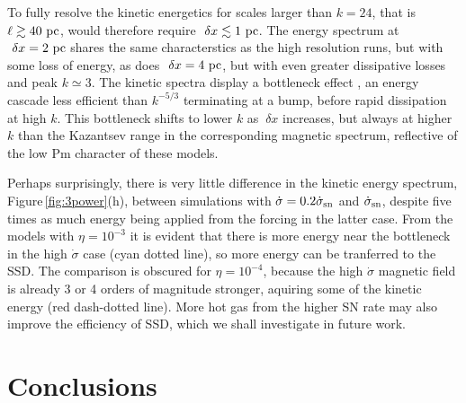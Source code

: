 \documentclass[preprint2]{aastex63}
\newcommand\SNr{\dot\sigma_{\rm sn}}
\newcommand\pc{~ {\rm pc}}
\newcommand\dx{~ {\delta x}}
\begin{document}
To fully resolve the kinetic energetics for scales larger than $k=24$, that is
$\ell\gtrsim40\pc$, would therefore require $\dx\lesssim1\pc$.
The energy spectrum at $\dx=2\pc$ shares the same characterstics as the high
resolution runs, but with some loss of energy, as does $\dx=4\pc$, but with 
even greater dissipative losses and peak $k\simeq3$.
The kinetic spectra display a bottleneck effect \citep{Falkovich94,HBD03},
an energy cascade less efficient than $k^{-5/3}$ terminating at a bump,
before rapid dissipation at high $k$.
This bottleneck shifts to lower $k$ as $\dx$ increases, but always at higher
$k$ than the Kazantsev range in the corresponding magnetic spectrum, reflective
of the low Pm character of these models.

Perhaps surprisingly, there is very little difference in the kinetic energy
spectrum, Figure\,\ref{fig:3power}(h), between simulations with
$\dot\sigma=0.2\SNr$ and $\SNr$, despite five times as much energy being 
applied from the forcing in the latter case.
From the models with $\eta=10^{-3}$ it is evident that there is more energy
near the bottleneck in the high $\dot\sigma$ case (cyan dotted line), so more
energy can be tranferred to the SSD.
The comparison is obscured for $\eta=10^{-4}$, because the high $\dot\sigma$
magnetic field is already 3 or 4 orders of magnitude stronger, aquiring some of
the kinetic energy (red dash-dotted line).
More hot gas from the higher SN rate may also improve the efficiency of SSD,
which we shall investigate in future work. 



\section{Conclusions}\label{sec:conc}
\end{document}
